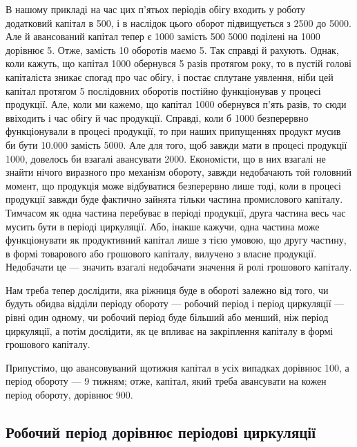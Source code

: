 В нашому прикладі на час цих п’ятьох періодів обігу входить у роботу
додатковий капітал в 500, і в наслідок цього оборот підвищується
з 2500 до 5000. Але й авансований капітал
тепер є 1000 замість 500 5000 поділені на 1000
дорівнює 5. Отже, замість 10 оборотів маємо 5. Так справді й рахують.
Однак, коли кажуть, що капітал 1000 обернувся 5 разів протягом
року, то в пустій голові капіталіста зникає спогад про час обігу,
і постає сплутане уявлення, ніби цей капітал протягом 5 послідовних
оборотів постійно функціонував у процесі продукції. Але, коли ми кажемо,
що капітал 1000 обернувся п’ять разів, то сюди ввіходить
і час обігу й час продукції. Справді, коли б 1000 безперервно
функціонували в процесі продукції, то при наших припущеннях продукт
мусив би бути \num{10.000} замість 5000. Але для того, щоб завжди
мати в процесі продукції 1000, довелось би взагалі авансувати
2000. Економісти, що в них взагалі не знайти нічого виразного
про механізм обороту, завжди недобачають той головний момент, що
продукція може відбуватися безперервно лише тоді, коли в процесі продукції
завжди буде фактично зайнята тільки частина промислового капіталу.
Тимчасом як одна частина перебуває в періоді продукції, друга частина
весь час мусить бути в періоді циркуляції. Або, інакше кажучи, одна
частина може функціонувати як продуктивний капітал лише з тією умовою,
що другу частину, в формі товарового або грошового капіталу, вилучено
з власне продукції. Недобачати це — значить взагалі недобачати значення
й ролі грошового капіталу.

Нам треба тепер дослідити, яка ріжниця буде в обороті залежно від
того, чи будуть обидва відділи періоду обороту — робочий період і період
циркуляції — рівні один одному, чи робочий період буде більший
або менший, ніж період циркуляції, а потім дослідити, як це впливає на
закріплення капіталу в формі грошового капіталу.

Припустімо, що авансовуваний щотижня капітал в усіх випадках дорівнює
100, а період обороту — 9 тижням; отже, капітал, який
треба авансувати на кожен період обороту, дорівнює 900.

\subsection{Робочий період дорівнює періодові циркуляції}

